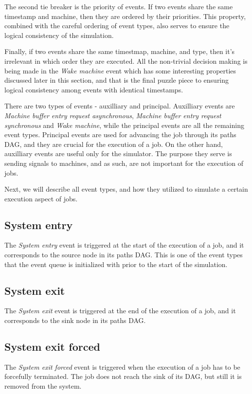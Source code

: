 The second tie breaker is the priority of events. If two events share the same timestamp and machine, then they are ordered by their priorities. This property, combined with the careful ordering of event types, also serves to ensure the logical consistency of the simulation.

Finally, if two events share the same timestmap, machine, and type, then it's irrelevant in which order they are executed. All the non-trivial decision making is being made in the \textit{Wake machine} event which has some interesting properties discussed later in this section, and that is the final puzzle piece to ensuring logical consistency among events with identical timestamps.

There are two types of events - auxilliary and principal. Auxilliary events are \textit{Machine buffer entry request asynchronous}, \textit{Machine buffer entry request synchronous} and \textit{Wake machine}, while the principal events are all the remaining event types. Principal events are used for advancing the job through its paths DAG, and they are crucial for the execution of a job. On the other hand, auxilliary events are useful only for the simulator. The purpose they serve is sending signals to machines, and as such, are not important for the execution of jobs.

Next, we will describe all event types, and how they utilized to simulate a certain execution aspect of jobs.

\subsection{System entry}
The \textit{System entry} event is triggered at the start of the execution of a job, and it corresponds to the source node in its paths DAG. This is one of the event types that the event queue is initialized with prior to the start of the simulation.

\subsection{System exit}
The \textit{System exit} event is triggered at the end of the execution of a job, and it corresponds to the sink node in its paths DAG.

\subsection{System exit forced}
The \textit{System exit forced} event is triggered when the execution of a job has to be forcefully terminated. The job does not reach the sink of its DAG, but still it is removed from the system.

